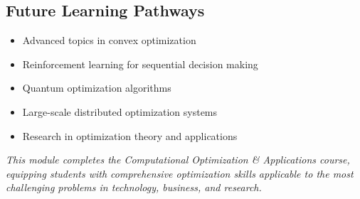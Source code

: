 \documentclass[
  letterpaper,
  DIV=11,
  numbers=noendperiod]{scrreprt}
\providecommand{\tightlist}{%
  \setlength{\itemsep}{0pt}\setlength{\parskip}{0pt}}
\begin{document}
\subsection{Future Learning Pathways}\label{future-learning-pathways}

\begin{itemize}
\tightlist
\item
  Advanced topics in convex optimization
\item
  Reinforcement learning for sequential decision making
\item
  Quantum optimization algorithms
\item
  Large-scale distributed optimization systems
\item
  Research in optimization theory and applications
\end{itemize}

\emph{This module completes the Computational Optimization \&
Applications course, equipping students with comprehensive optimization
skills applicable to the most challenging problems in technology,
business, and research.}
\end{document}
